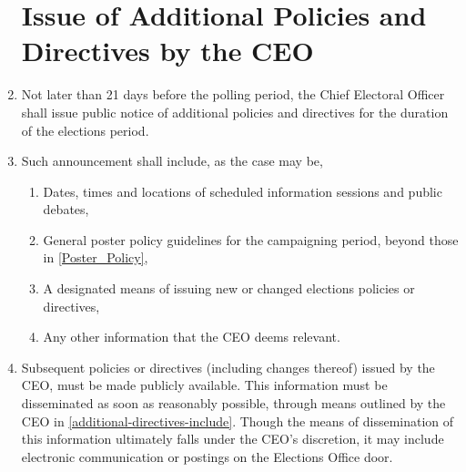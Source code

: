 \documentclass[oneside]{book}
\begin{document}
\begin{enumerate}
\section{\label{1_Issue_of_Additional_Policies_and_Directives_by_the_CEO}Issue
of Additional Policies and Directives by the CEO }
\item Not later than 21 days before the polling period, the Chief Electoral
Officer shall issue public notice of additional policies and directives
for the duration of the elections period. 
\item \label{additional-directives-include}Such announcement shall include,
as the case may be, 

\begin{enumerate}
\item Dates, times and locations of scheduled information sessions and public
debates, 
\item General poster policy guidelines for the campaigning period, beyond
those in \autoref{Poster_Policy}, 
\item A designated means of issuing new or changed elections policies or
directives, 
\item Any other information that the CEO deems relevant. 
\end{enumerate}
\item Subsequent policies or directives (including changes thereof) issued
by the CEO, must be made publicly available. This information must
be disseminated as soon as reasonably possible, through means outlined
by the CEO in \autoref{additional-directives-include}. Though
the means of dissemination of this information ultimately falls under
the CEO's discretion, it may include electronic communication or postings
on the Elections Office door. 


\end{enumerate}
\end{document}
